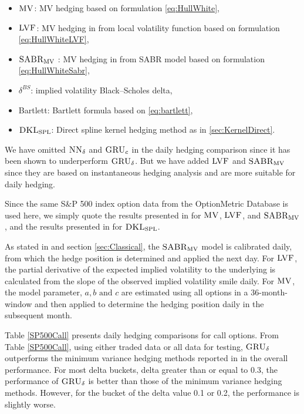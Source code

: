 \documentclass[letterpaper,12pt,titlepage,oneside,final]{book}
\numberwithin{equation}{section}
\theoremstyle{definition}
\newcommand{\model}{\textsc{GRU}_\delta}
\newcommand{\modelN}{\textsc{NN}_\delta}
\newcommand{\DKLs}{\bf\textsc{DKL}_{\text{SPL}}}
\newcommand{\LVF}{\textsc{LVF}}
\newcommand{\SABR}{\bf\textsc{SABR}_{\text{MV}}}
\newcommand{\MV}{\bf \textsc{MV}}
\begin{document}
\begin{itemize}
	\item $\MV$: MV hedging   based on formulation \eqref{eq:HullWhite},
\item ${\LVF}$: MV hedging in \cite{hulloptimal} from local volatility function based on formulation \eqref{eq:HullWhiteLVF},
\item ${\SABR}$ : MV hedging in  \cite{hulloptimal} from {{SABR}} model based on formulation \eqref{eq:HullWhiteSabr},
\item ${\delta^{BS}}$:  implied  volatility Black–Scholes delta,
\item Bartlett: Bartlett formula based on \eqref{eq:bartlett},
  \item $\DKLs$: Direct spline kernel hedging method as in \ref{sec:KernelDirect}.
\end{itemize}

We have omitted  $\modelN$ and $\textsc{GRU}_{c}$ in the daily hedging comparison since it has been shown to underperform $\model$. But we  have added ${\LVF}$ and ${\SABR}$ since they are based on instantaneous hedging analysis and are more suitable for daily hedging.

Since the  same S\&P 500 index option data from the OptionMetric Database is used here,  we simply quote the results  presented in \cite{hulloptimal} for  $\MV$,  ${\LVF}$,  and ${\SABR}$, and the results  presented in \cite{knian2017} for  $\DKLs$.

As stated in \cite{hulloptimal} and section \ref{sec:Classical},
the ${\SABR}$ model is calibrated daily, from which the hedge position is determined and applied the next day.
For  ${\LVF}$, the partial derivative of the expected implied volatility to the underlying is calculated from the slope of the observed implied volatility smile daily.  For $\MV$, the model parameter, $a,b \text{ and } c$ are estimated using all options in a 36-month-window and then applied to determine the hedging position daily in the subsequent month.


Table \ref{SP500Call} presents daily hedging comparisons for call options.
From  Table \ref{SP500Call}, using either {traded} data or {all} data for testing, $\model$  outperforms the minimum variance hedging methods reported in \cite{hulloptimal} in the overall performance.   For most delta buckets, delta greater than or equal to 0.3, the performance of  $\model$  is better than those of the minimum variance hedging methods. However, for the bucket of the delta value 0.1 or 0.2, the performance is slightly worse.
\end{document}
